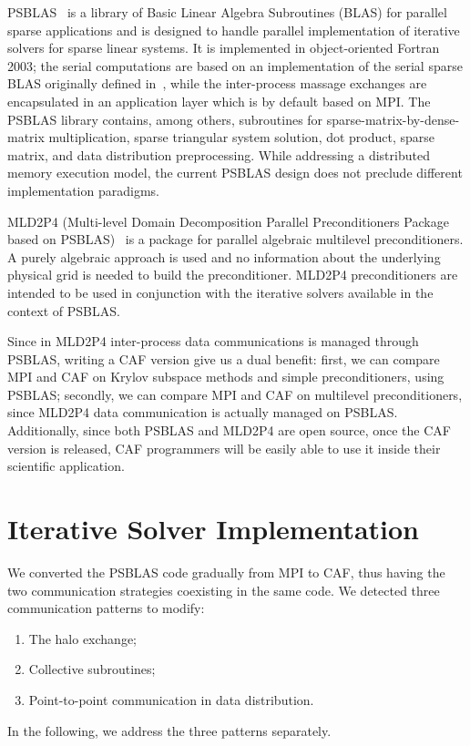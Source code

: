 \documentclass{IOS-Book-Article}
\begin{document}
PSBLAS~\cite{PSBLAS} is a library of Basic Linear Algebra Subroutines (BLAS) for parallel
sparse applications and is designed to handle parallel implementation of
iterative solvers for sparse linear systems. It is implemented in 
object-oriented Fortran 2003; the serial computations are based on an
implementation of the serial sparse BLAS originally defined
in~\cite{duff2002overview}, while the inter-process 
massage exchanges are encapsulated in an application layer which is by
default based on MPI. The PSBLAS library contains, among 
others, 
subroutines for sparse-matrix-by-dense-matrix multiplication, sparse
triangular system solution, dot product, sparse matrix, and data
distribution preprocessing. 
While addressing a distributed memory execution model, the current
PSBLAS design does not preclude different implementation paradigms. 
 
MLD2P4 (Multi-level Domain Decomposition Parallel Preconditioners
Package based on PSBLAS)~\cite{mld-toms} is a package for parallel algebraic
multilevel preconditioners. A purely algebraic approach is used and no
information about the underlying physical grid is needed to build the
preconditioner. MLD2P4 preconditioners are intended to be used in
conjunction with the iterative solvers available in the context of
PSBLAS.

Since in MLD2P4 inter-process data communications is managed through
PSBLAS, writing a CAF version give us a dual benefit: first, we can compare MPI and CAF on Krylov subspace methods and simple preconditioners, using PSBLAS; 
secondly, we can compare MPI and CAF on multilevel preconditioners, since MLD2P4 data communication is actually managed on PSBLAS. 
Additionally, since both PSBLAS and MLD2P4 are open source, once the
CAF version is released, CAF programmers will be easily able to use it 
inside their scientific application. 

 
\section{Iterative Solver Implementation} \label{sec:iterative}

We converted the PSBLAS code gradually from MPI to CAF, thus having
the two communication strategies coexisting in the same code.  
We detected three communication patterns to modify:
\begin{enumerate}
\item The halo exchange;
\item Collective subroutines;
\item Point-to-point communication in data distribution.
\end{enumerate}
In the following, we address the three patterns  separately.
\end{document}
